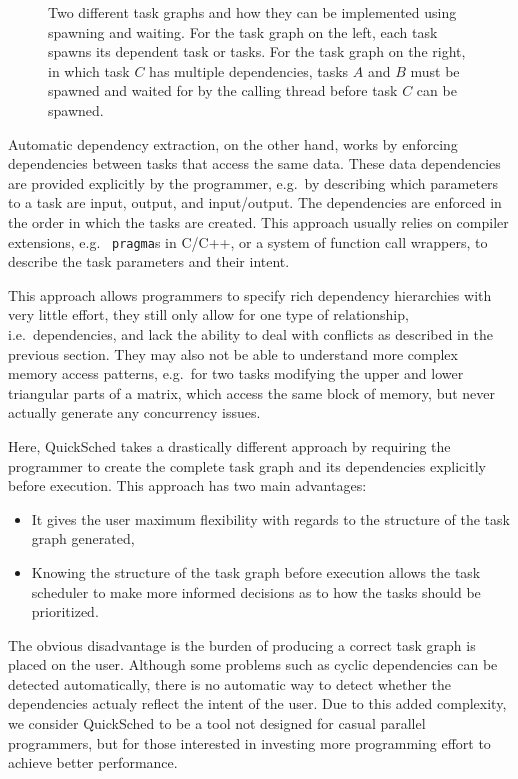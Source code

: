 \documentclass[preprint]{elsarticle}
\begin{document}
\begin{figure}
    \centerline{}
    \caption{Two different task graphs and how they can be implemented
      using spawning and waiting.
      For the task graph on the left, each task spawns its dependent
      task or tasks. For the task graph on the right, in which task $C$
      has multiple dependencies, tasks $A$ and $B$ must be spawned and waited
      for by the calling thread before task $C$ can be spawned.}
    \label{fig:Spawn}
\end{figure}

Automatic dependency extraction, on the other hand,
works by enforcing dependencies
between tasks that access the same data.
These data dependencies are provided explicitly by the programmer, e.g.~by
describing which parameters to a task are input, output, and input/output.
The dependencies are enforced in the order in which the tasks are 
created.
This approach usually relies on compiler extensions, e.g.~ {\tt pragma}s
in C/C++, or a system of function call wrappers, to describe the task parameters
and their intent.

This approach allows programmers to specify rich dependency hierarchies
with very little effort, they still only allow for one type of relationship,
i.e.~dependencies, and lack the ability to deal with conflicts as
described in the previous section.
They may also not be able to understand more complex memory access patterns,
e.g.~for two tasks modifying the upper and lower triangular parts of a matrix,
which access the same block of memory, but never actually generate any
concurrency issues.


Here, QuickSched takes a drastically different approach by requiring
the programmer to create the complete task graph and its dependencies
explicitly before execution.
This approach has two main advantages:
\begin{itemize}
  \item It gives the user maximum flexibility with regards to the
    structure of the task graph generated,
  \item Knowing the structure of the task graph before execution
    allows the task scheduler to make more informed decisions
    as to how the tasks should be prioritized.
\end{itemize}

\noindent The obvious disadvantage is the burden of producing a correct
task graph is placed on the user.
Although some problems such as cyclic dependencies can be detected
automatically, there is no automatic way to detect whether the
dependencies actualy reflect the intent of the user.
Due to this added complexity, we consider QuickSched to be
a tool not designed for casual parallel programmers, but for 
those interested in investing more programming effort to achieve
better performance.
\end{document}
